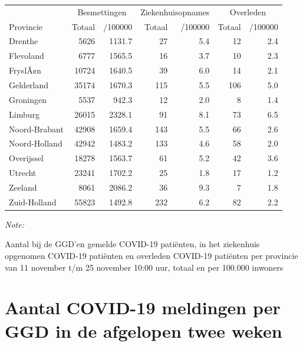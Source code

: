 \documentclass[
  english,
  man,floatsintext]{apa6}
\begin{document}
\begin{table}
\centering
\begin{threeparttable}
\begin{tabular}{lrrrrrr}
\toprule
\multicolumn{1}{c}{ } & \multicolumn{2}{c}{Besmettingen} & \multicolumn{2}{c}{Ziekenhuisopnames} & \multicolumn{2}{c}{Overleden} \\
\cmidrule(l{3pt}r{3pt}){2-3} \cmidrule(l{3pt}r{3pt}){4-5} \cmidrule(l{3pt}r{3pt}){6-7}
Provincie & Totaal & /100000 & Totaal & /100000 & Totaal & /100000\\
\midrule
Drenthe & 5626 & 1131.7 & 27 & 5.4 & 12 & 2.4\\
Flevoland & 6777 & 1565.5 & 16 & 3.7 & 10 & 2.3\\
FryslÃ¢n & 10724 & 1640.5 & 39 & 6.0 & 14 & 2.1\\
Gelderland & 35174 & 1670.3 & 115 & 5.5 & 106 & 5.0\\
Groningen & 5537 & 942.3 & 12 & 2.0 & 8 & 1.4\\
Limburg & 26015 & 2328.1 & 91 & 8.1 & 73 & 6.5\\
Noord-Brabant & 42908 & 1659.4 & 143 & 5.5 & 66 & 2.6\\
Noord-Holland & 42942 & 1483.2 & 133 & 4.6 & 58 & 2.0\\
Overijssel & 18278 & 1563.7 & 61 & 5.2 & 42 & 3.6\\
Utrecht & 23241 & 1702.2 & 25 & 1.8 & 17 & 1.2\\
Zeeland & 8061 & 2086.2 & 36 & 9.3 & 7 & 1.8\\
Zuid-Holland & 55823 & 1492.8 & 232 & 6.2 & 82 & 2.2\\
\bottomrule
\end{tabular}
\begin{tablenotes}
\item \textit{Note: } 
\item Aantal bij de GGD’en gemelde COVID-19 patiënten, in het ziekenhuis opgenomen COVID-19 patiënten en overleden COVID-19 patiënten per provincie van 11 november t/m 25 november 10:00 uur, totaal en per 100.000 inwoners
\end{tablenotes}
\end{threeparttable}
\end{table}

\newpage

\hypertarget{aantal-covid-19-meldingen-per-ggd-in-de-afgelopen-twee-weken}{%
\section{Aantal COVID-19 meldingen per GGD in de afgelopen twee weken}\label{aantal-covid-19-meldingen-per-ggd-in-de-afgelopen-twee-weken}}
\end{document}
